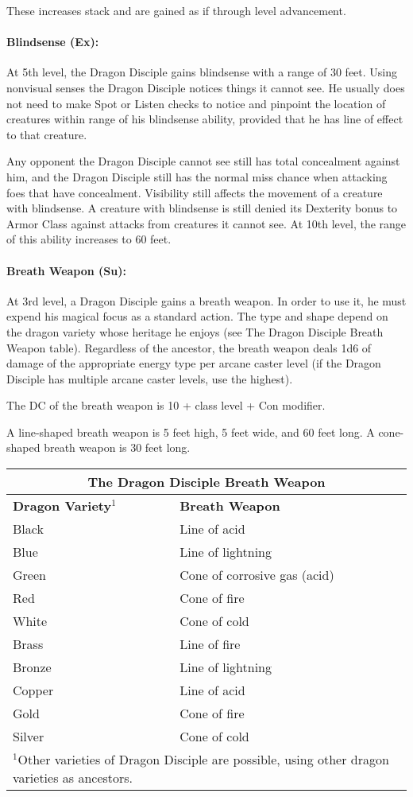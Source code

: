 These increases stack and are gained as if through level advancement.

\paragraph{Blindsense (Ex):}
At 5th level, the Dragon Disciple gains blindsense with a range of 30 feet. 
Using nonvisual senses the Dragon Disciple notices things it cannot see. 
He usually does not need to make Spot or Listen checks to notice and pinpoint the location of creatures within range of his blindsense ability, 
provided that he has line of effect to that creature.

Any opponent the Dragon Disciple cannot see still has total concealment against him, 
and the Dragon Disciple still has the normal miss chance when attacking foes that have concealment. 
Visibility still affects the movement of a creature with blindsense. 
A creature with blindsense is still denied its Dexterity bonus to Armor Class against attacks from creatures it cannot see. 
At 10th level, the range of this ability increases to 60 feet.
\paragraph{Breath Weapon (Su):}
At 3rd level, a Dragon Disciple gains a breath weapon.
In order to use it, he must expend his magical focus as a standard action.
The type and shape depend on the dragon variety whose heritage he enjoys (see The Dragon Disciple Breath Weapon table). 
Regardless of the ancestor, the breath weapon deals 1d6 of damage of the appropriate energy type per arcane caster level 
(if the Dragon Disciple has multiple arcane caster levels, use the highest).

The DC of the breath weapon is 10 + class level + Con modifier.

A line-shaped breath weapon is 5 feet high, 5 feet wide, and 60 feet long. A cone-shaped breath weapon is 30 feet long.

\begin{center}
\begin{tabular}{|p{3cm}|p{3.4cm}|}
\multicolumn{2}{c}{\textbf{The Dragon Disciple Breath Weapon}}\\
\hline
\textbf{Dragon Variety}$^1$&\textbf{Breath Weapon}\\
\hline
Black		&Line of acid\\
Blue		&Line of lightning\\
Green		&Cone of corrosive gas (acid)\\
Red		&Cone of fire\\
White		&Cone of cold\\
Brass		&Line of fire\\
Bronze		&Line of lightning\\
Copper		&Line of acid\\
Gold		&Cone of fire\\
Silver		&Cone of cold\\
\hline
\multicolumn{2}{p{6.4cm}}{\scriptsize $^1$Other varieties of Dragon Disciple are possible, using other dragon varieties as ancestors.}
\end{tabular}
\end{center}

